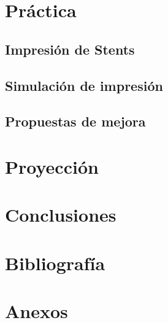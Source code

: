 \documentclass[a4paper,12pt]{article}
\begin{document}
\pagebreak
\section{Práctica}
\subsection{Impresión de Stents}
\subsection{Simulación de impresión}
\subsection{Propuestas de mejora}



\pagebreak
\section{Proyección}

\pagebreak
\section{Conclusiones}


\pagebreak
\section{Bibliografía}


\pagebreak
\section{Anexos}
\end{document}
